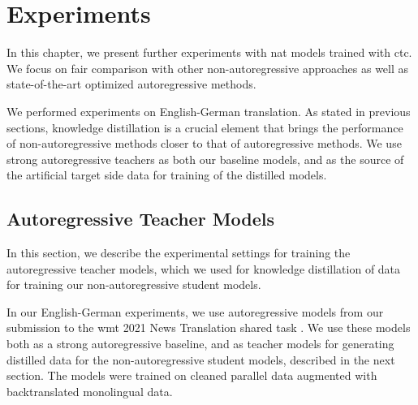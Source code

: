 \chapter{Experiments}
\label{chap:experiments}

In this chapter, we present further experiments with \ac{nat} models trained
with \ac{ctc}. We focus on fair comparison with other non-autoregressive
approaches as well as state-of-the-art optimized autoregressive methods.

We performed experiments on English-German translation. As stated in previous
sections, knowledge distillation \citep{kim-rush-2016-sequence} is a crucial
element that brings the performance of non-autoregressive methods closer to
that of autoregressive methods. We use strong autoregressive teachers as both
our baseline models, and as the source of the artificial target side data for
training of the distilled models.

\section{Autoregressive Teacher Models}
\label{sec:exp:autoregressive}


\noindent
In this section, we describe the experimental settings for training the
autoregressive teacher models, which we used for knowledge distillation of data
for training our non-autoregressive student models.

In our English-German experiments, we use autoregressive models from our
submission to the \ac{wmt} 2021 News Translation shared task
\citep{chen-etal-2021-university}. We use these models both as a strong
autoregressive baseline, and as teacher models for generating distilled data
for the non-autoregressive student models, described in the next section.  The
models were trained on cleaned parallel data augmented with backtranslated
monolingual data.

